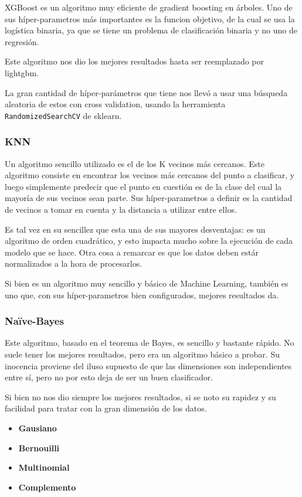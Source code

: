 \documentclass[a4paper]{article}
\begin{document}
XGBoost es un algoritmo muy eficiente de gradient boosting en árboles. Uno de sus híper-parametros más importantes es la funcion objetivo, de la cual se usa la logística binaria, ya que se tiene un problema de clasificación binaria y no uno de regresión.

Este algoritmo nos dio los mejores resultados hasta ser reemplazado por lightgbm.

La gran cantidad de híper-parámetros que tiene nos llevó a usar una búsqueda aleatoria de estos con cross validation, usando la herramienta \texttt{RandomizedSearchCV} de sklearn.

\subsubsection{KNN}

Un algoritmo sencillo utilizado es el de los K vecinos más cercanos. Este algoritmo consiste en encontrar los vecinos más cercanos del punto a clasificar, y luego simplemente predecir que el punto en cuestión es de la clase del cual la mayoría de sus vecinos sean parte. Sus híper-parametros a definir es la cantidad de vecinos a tomar en cuenta y la distancia a utilizar entre ellos. 

Es tal vez en su sencillez que esta una de sus mayores desventajas: es un algoritmo de orden cuadrático, y esto impacta mucho sobre la ejecución de cada modelo que se hace. Otra cosa a remarcar es que los datos deben estár normalizados a la hora de procesarlos.

Si bien es un algoritmo muy sencillo y básico de Machine Learning, también es uno que, con sus híper-parametros bien configurados, mejores resultados da. 

\subsubsection{Naïve-Bayes}

Este algoritmo, basado en el teorema de Bayes, es sencillo y bastante rápido. No suele tener los mejores resultados, pero era un algoritmo básico a probar. Su inocencia proviene del iluso supuesto de que las dimensiones son independientes entre sí, pero no por esto deja de ser un buen clasificador.

Si bien no nos dio siempre los mejores resultados, si se noto su rapidez y su facilidad para tratar con la gran dimensión de los datos.

\begin{itemize}
	\item \textbf{Gausiano}
	
	\item \textbf{Bernouilli}
	
	\item \textbf{Multinomial}	
	
 	\item \textbf{Complemento}
\end{itemize}
\end{document}
